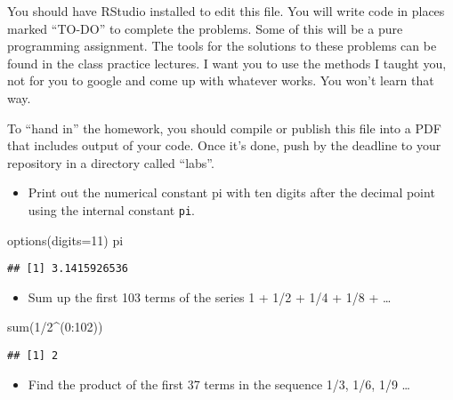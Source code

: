 \documentclass[
]{article}
\author{}
\date{\vspace{-2.5em}}
\newenvironment{Shaded}{\begin{snugshade}}{\end{snugshade}}
\newcommand{\AttributeTok}[1]{\textcolor[rgb]{0.77,0.63,0.00}{#1}}
\newcommand{\DecValTok}[1]{\textcolor[rgb]{0.00,0.00,0.81}{#1}}
\newcommand{\FunctionTok}[1]{\textcolor[rgb]{0.00,0.00,0.00}{#1}}
\newcommand{\NormalTok}[1]{#1}
\newcommand{\SpecialCharTok}[1]{\textcolor[rgb]{0.00,0.00,0.00}{#1}}
\providecommand{\tightlist}{%
  \setlength{\itemsep}{0pt}\setlength{\parskip}{0pt}}
\begin{document}
You should have RStudio installed to edit this file. You will write code
in places marked ``TO-DO'' to complete the problems. Some of this will
be a pure programming assignment. The tools for the solutions to these
problems can be found in the class practice lectures. I want you to use
the methods I taught you, not for you to google and come up with
whatever works. You won't learn that way.

To ``hand in'' the homework, you should compile or publish this file
into a PDF that includes output of your code. Once it's done, push by
the deadline to your repository in a directory called ``labs''.

\begin{itemize}
\tightlist
\item
  Print out the numerical constant pi with ten digits after the decimal
  point using the internal constant \texttt{pi}.
\end{itemize}

\begin{Shaded}
\begin{Highlighting}[]
\FunctionTok{options}\NormalTok{(}\AttributeTok{digits=}\DecValTok{11}\NormalTok{)}
\NormalTok{pi}
\end{Highlighting}
\end{Shaded}

\begin{verbatim}
## [1] 3.1415926536
\end{verbatim}

\begin{itemize}
\tightlist
\item
  Sum up the first 103 terms of the series 1 + 1/2 + 1/4 + 1/8 +
  \ldots{}
\end{itemize}

\begin{Shaded}
\begin{Highlighting}[]
\FunctionTok{sum}\NormalTok{(}\DecValTok{1}\SpecialCharTok{/}\DecValTok{2}\SpecialCharTok{\^{}}\NormalTok{(}\DecValTok{0}\SpecialCharTok{:}\DecValTok{102}\NormalTok{))}
\end{Highlighting}
\end{Shaded}

\begin{verbatim}
## [1] 2
\end{verbatim}

\begin{itemize}
\tightlist
\item
  Find the product of the first 37 terms in the sequence 1/3, 1/6, 1/9
  \ldots{}
\end{itemize}
\end{document}
